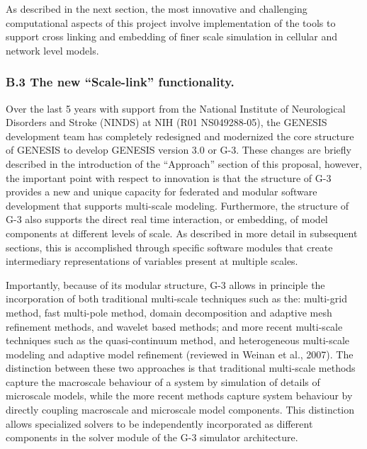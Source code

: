 \documentclass[12pt]{article}
\begin{document}
As described in the next section,
the most innovative and challenging computational aspects of this
project involve implementation of the tools to support cross linking and embedding of finer scale simulation
in cellular and network level models.\\

\subsubsection*{B.3 The new ``Scale-link'' functionality.}

\noindent Over the last 5 years with
support from the National Institute of Neurological Disorders and
Stroke (NINDS) at NIH (R01 NS049288-05), the GENESIS development team has
completely redesigned and modernized the core structure of GENESIS to
develop GENESIS version 3.0 or G-3. These changes are briefly
described in the introduction of the ``Approach'' section of this
proposal, however, the important point with respect to innovation is that
the structure of G-3 provides a new and unique capacity for
federated and modular software development that supports multi-scale
modeling. Furthermore, the structure of G-3 also supports the direct real
time interaction, or embedding, of model components at different levels of scale.
As described in more detail in
subsequent sections, this is accomplished through
specific software modules that create intermediary representations of
variables present at multiple scales.

Importantly, because of its modular structure, G-3 allows in principle
the incorporation of both traditional multi-scale techniques such as the:
multi-grid method, fast multi-pole method, domain decomposition and
adaptive mesh refinement methods, and wavelet based methods; and more recent
multi-scale techniques such as the quasi-continuum method, and heterogeneous
multi-scale modeling and adaptive model refinement (reviewed in Weinan et al., 2007).  The distinction
between these two approaches is that traditional multi-scale
methods capture the macroscale behaviour of a system by simulation of details
of microscale models, while the more recent methods capture system
behaviour by directly coupling macroscale and microscale model components.  This
distinction allows specialized solvers to be independently incorporated as different components in the solver module of the G-3 simulator
architecture.
\end{document}
